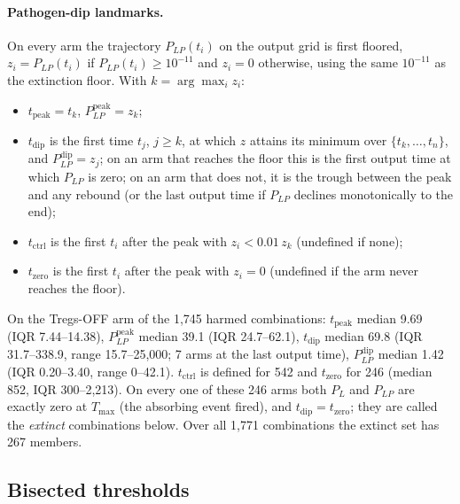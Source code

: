 \documentclass[11pt]{article}
\begin{document}
\paragraph{Pathogen-dip landmarks.}
On every arm the trajectory $P_{LP}(t_i)$ on the output grid is first floored,
$z_i = P_{LP}(t_i)$ if $P_{LP}(t_i)\ge 10^{-11}$ and $z_i=0$ otherwise, using the
same $10^{-11}$ as the extinction floor. With $k=\arg\max_i z_i$:
\begin{itemize}
\item $t_{\mathrm{peak}}=t_k$, $P_{LP}^{\mathrm{peak}}=z_k$;
\item $t_{\mathrm{dip}}$ is the first time $t_j$, $j\ge k$, at which $z$ attains
  its minimum over $\{t_k,\dots,t_n\}$, and $P_{LP}^{\mathrm{dip}}=z_j$; on an arm
  that reaches the floor this is the first output time at which $P_{LP}$ is zero;
  on an arm that does not, it is the trough between the peak and any rebound (or
  the last output time if $P_{LP}$ declines monotonically to the end);
\item $t_{\mathrm{ctrl}}$ is the first $t_i$ after the peak with
  $z_i<0.01\,z_k$ (undefined if none);
\item $t_{\mathrm{zero}}$ is the first $t_i$ after the peak with $z_i=0$
  (undefined if the arm never reaches the floor).
\end{itemize}
On the Tregs-OFF arm of the 1,745 harmed combinations: $t_{\mathrm{peak}}$ median
9.69 (IQR 7.44--14.38), $P_{LP}^{\mathrm{peak}}$ median 39.1 (IQR 24.7--62.1),
$t_{\mathrm{dip}}$ median 69.8 (IQR 31.7--338.9, range 15.7--25,000; 7 arms at the
last output time), $P_{LP}^{\mathrm{dip}}$ median 1.42 (IQR 0.20--3.40, range
0--42.1). $t_{\mathrm{ctrl}}$ is defined for 542 and $t_{\mathrm{zero}}$ for 246
(median 852, IQR 300--2,213). On every one of these 246 arms both $P_L$ and
$P_{LP}$ are exactly zero at $T_{\max}$ (the absorbing event fired), and
$t_{\mathrm{dip}}=t_{\mathrm{zero}}$; they are called the \emph{extinct}
combinations below. Over all 1,771 combinations the extinct set has 267 members.

\subsection{Bisected thresholds}
\end{document}
